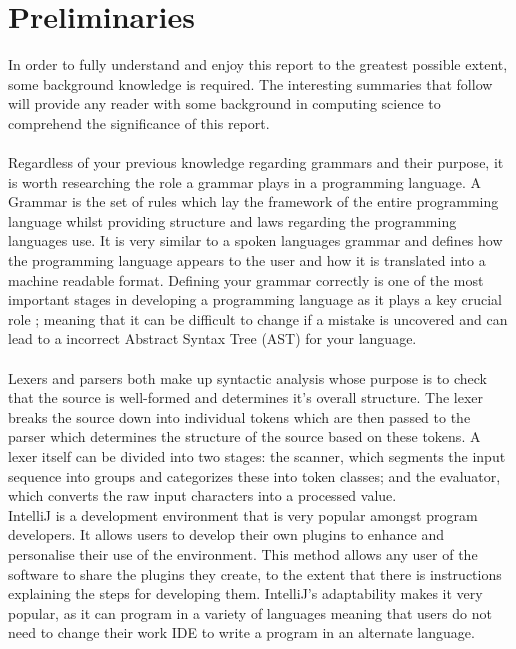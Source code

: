 \documentclass{l3proj}
\begin{document}
\section{Preliminaries}
In order to fully understand and enjoy this report to the greatest possible extent, some background knowledge is required. The interesting summaries that follow will provide any reader with some background in computing science to comprehend the significance of this report.\\
\\
Regardless of your previous knowledge regarding grammars and their purpose, it is worth researching the role a grammar plays in a programming language. A Grammar is the set of rules which lay the framework of the entire programming language whilst providing structure and laws regarding the programming languages use. It is very similar to a spoken languages grammar and defines how the programming language appears to the user and how it is translated into a machine readable format. Defining your grammar correctly is one of the most important stages in developing a programming language as it plays a key crucial role ; meaning that it can be difficult to change if a mistake is uncovered and can lead to a incorrect Abstract Syntax Tree (AST) for your language. \\
\\
Lexers and parsers both make up syntactic analysis whose purpose is to check that the source is well-formed and determines it's overall structure. The lexer breaks the source down into individual tokens which are then passed to the parser which determines the structure of the source based on these tokens. A lexer itself can be divided into two stages: the scanner, which segments the input sequence into groups and categorizes these into token classes; and the evaluator, which converts the raw input characters into a processed value.
\\
IntelliJ is a development environment that is very popular amongst program developers. It allows users to develop their own plugins to enhance and personalise their use of the environment. This method allows any user of the software to share the plugins they create, to the extent that there is instructions explaining the steps for developing them. IntelliJ's adaptability makes it very popular, as it can program in a variety of languages meaning that users do not need to change their work IDE to write a program in an alternate language.\\
\\
\end{document}
